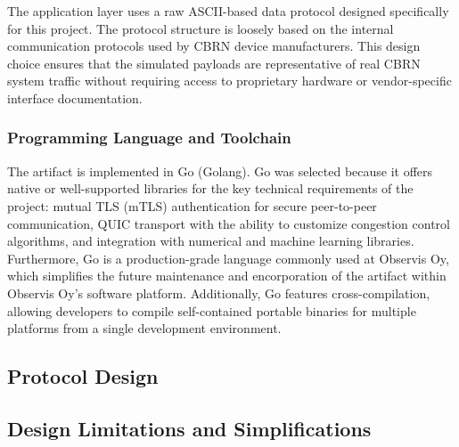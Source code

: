 The application layer uses a raw ASCII-based data protocol designed specifically for this project. The protocol structure is loosely based on the internal communication protocols used by CBRN device manufacturers. This design choice ensures that the simulated payloads are representative of real CBRN system traffic without requiring access to proprietary hardware or vendor-specific interface documentation.

\subsubsection{Programming Language and Toolchain}
The artifact is implemented in Go (Golang). Go was selected because it offers native or well-supported libraries for the key technical requirements of the project: mutual TLS (mTLS) authentication for secure peer-to-peer communication, QUIC transport with the ability to customize congestion control algorithms, and integration with numerical and machine learning libraries. Furthermore, Go is a production-grade language commonly used at Observis Oy, which simplifies the future maintenance and encorporation of the artifact within Observis Oy's software platform. Additionally, Go features cross-compilation, allowing developers to compile self-contained portable binaries for multiple platforms from a single development environment. 
\subsection{Protocol Design}
\subsection{Design Limitations and Simplifications}
\clearpage
